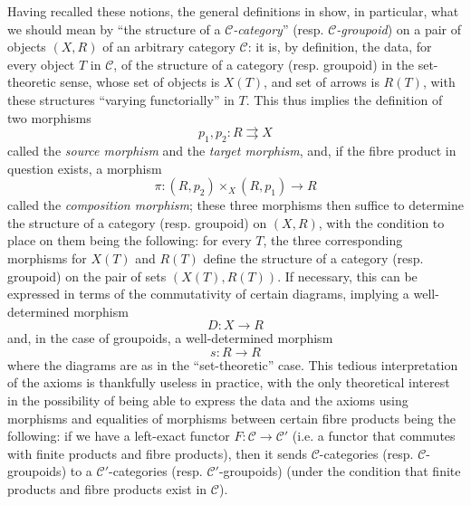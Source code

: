 \documentclass{article}
\renewcommand{\cal}[1]{{\mathcal{#1}}}
\newcommand{\oldpage}[1]{\marginpar{\footnotesize$\Big\vert$ \textit{p.~#1}}}
\begin{document}
Having recalled these notions, the general definitions in \cite[\S A.1]{2} show, in particular, what we should mean by ``the structure of a \emph{$\cal{C}$-category}'' (resp. \emph{$\cal{C}$-groupoid}) on a pair of objects $(X,R)$ of an arbitrary category $\cal{C}$:
it is, by definition, the data, for every object $T$ in $\cal{C}$, of the structure of a category (resp. groupoid) in the set-theoretic sense, whose set of objects is $X(T)$, and set of arrows is $R(T)$, with these structures ``varying functorially'' in $T$.
This thus implies the definition of two morphisms
\[
  p_1,p_2\colon R\rightrightarrows X
\]
called the \emph{source morphism} and the \emph{target morphism}, and, if the fibre product in question exists, a morphism
\oldpage{212-09}
\[
  \pi\colon (R,p_2)\times_X(R,p_1) \to R
\]
called the \emph{composition morphism};
these three morphisms then suffice to determine the structure of a category (resp. groupoid) on $(X,R)$, with the condition to place on them being the following: for every $T$, the three corresponding morphisms for $X(T)$ and $R(T)$ define the structure of a category (resp. groupoid) on the pair of sets $(X(T),R(T))$.
If necessary, this can be expressed in terms of the commutativity of certain diagrams, implying a well-determined morphism
\[
  D\colon X\to R
\]
and, in the case of groupoids, a well-determined morphism
\[
  s\colon R\to R
\]
where the diagrams are as in the ``set-theoretic'' case.
This tedious interpretation of the axioms is thankfully useless in practice, with the only theoretical interest in the possibility of being able to express the data and the axioms using morphisms and equalities of morphisms between certain fibre products being the following: if we have a left-exact functor $F\colon\cal{C}\to\cal{C}'$ (i.e. a functor that commutes with finite products and fibre products), then it sends $\cal{C}$-categories (resp. $\cal{C}$-groupoids) to a $\cal{C}'$-categories (resp. $\cal{C}'$-groupoids) (under the condition that finite products and fibre products exist in $\cal{C}$).
\end{document}
